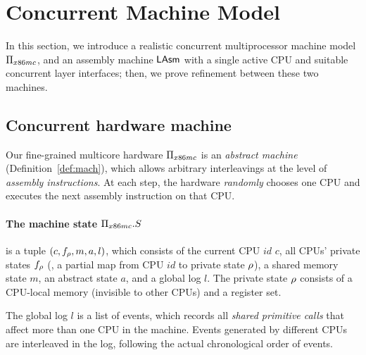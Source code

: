 \newcommand{\PBoot}{\mathsf{PBoot}}
\newcommand{\XAsm}{\mathsf{XAsm}}

\section{Concurrent Machine Model}
\label{sec:mach}


In this section, we introduce a realistic
concurrent multiprocessor machine model $\Pi_{x86mc}$,
and an assembly machine $\mathsf{LAsm}$ with a single active CPU
and suitable concurrent layer interfaces; then, we prove
refinement between these two machines.

\subsection{Concurrent hardware machine}
Our fine-grained multicore hardware $\Pi_{x86mc}$
is an \emph{abstract machine} (\cf Definition~\ref{def:mach}),
which allows arbitrary
interleavings at the level of \emph{assembly instructions}.
At each step, the hardware \emph{randomly} chooses one CPU 
and executes the next assembly instruction on that CPU.


\paragraph{The machine state $\Pi_{x86mc}.S$} is a tuple $(c, f_\rho, m, a, l)$,
which consists of 
the current CPU $id$ $c$,
all CPUs' private states $f_\rho$
(\ie, a partial map from CPU $id$ to private state $\rho$),
a shared memory state $m$,
an abstract state $a$, and a global log $l$.
The private state $\rho$ consists of a CPU-local memory
(invisible to other CPUs) and a register set.

The global log $l$ 
is a list of events, which records all \emph{shared primitive calls} that affect more than
one CPU in the machine. Events generated by different CPUs are
interleaved in the log, following the actual chronological order of events.

